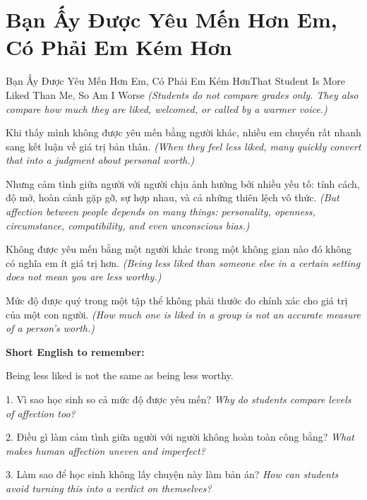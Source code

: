 \section{Bạn Ấy Được Yêu Mến Hơn Em, Có Phải Em Kém Hơn}
\begin{truyen}{Bạn Ấy Được Yêu Mến Hơn Em, Có Phải Em Kém Hơn}{That Student Is More Liked Than Me, So Am I Worse}
\textit{(Students do not compare grades only. They also compare how much they are liked, welcomed, or called by a warmer voice.)}

Khi thấy mình không được yêu mến bằng người khác, nhiều em chuyển rất nhanh sang kết luận về giá trị bản thân.
\textit{(When they feel less liked, many quickly convert that into a judgment about personal worth.)}

Nhưng cảm tình giữa người với người chịu ảnh hưởng bởi nhiều yếu tố: tính cách, độ mở, hoàn cảnh gặp gỡ, sự hợp nhau, và cả những thiên lệch vô thức.
\textit{(But affection between people depends on many things: personality, openness, circumstance, compatibility, and even unconscious bias.)}

Không được yêu mến bằng một người khác trong một không gian nào đó không có nghĩa em ít giá trị hơn.
\textit{(Being less liked than someone else in a certain setting does not mean you are less worthy.)}
\end{truyen}

\begin{baihoc}
Mức độ được quý trong một tập thể không phải thước đo chính xác cho giá trị của một con người.
\textit{(How much one is liked in a group is not an accurate measure of a person's worth.)}
\end{baihoc}

\begin{ghinhoanh}
\textbf{Short English to remember:}

Being less liked is not the same as being less worthy.

\end{ghinhoanh}

\begin{tuhocnhanh}
1. Vì sao học sinh so cả mức độ được yêu mến? \textit{Why do students compare levels of affection too?}

2. Điều gì làm cảm tình giữa người với người không hoàn toàn công bằng? \textit{What makes human affection uneven and imperfect?}

3. Làm sao để học sinh không lấy chuyện này làm bản án? \textit{How can students avoid turning this into a verdict on themselves?}
\end{tuhocnhanh}
\ngancach

